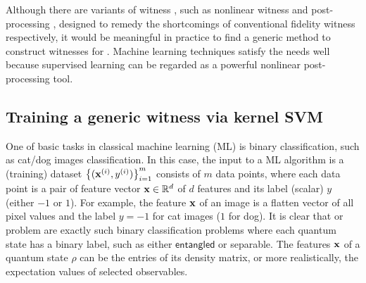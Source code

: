 \documentclass[
aps,
pra,
twocolumn,
floatfix,
]{revtex4-2}
\theoremstyle{plain}
\theoremstyle{definition}
\newcommand{\dm}{\rho}
\newcommand{\entangled}{\textsf{entangled}}
\begin{document}
Although there are variants of witness \cite{zhouEntanglementDetectionCoherent2020}, such as nonlinear witness \cite{guhneNonlinearEntanglementWitnesses2006} and post-processing \cite{zhanDetectingEntanglementUnfaithful2021}, designed to remedy the shortcomings of conventional fidelity witness respectively, 
it would be meaningful in practice to find a generic method to construct witnesses for .
Machine learning techniques satisfy the needs well because supervised learning can be regarded as a powerful nonlinear post-processing tool.


\subsection{Training a generic witness via kernel SVM}
One of basic tasks in classical machine learning (ML) is binary classification,
such as cat/dog images classification. 
In this case, the input to a ML algorithm is a (training) dataset $\qty{(\vb{x}^{(i)},y^{(i)})}_{i=1}^m$ consists of $m$ data points, 
where each data point is a pair of feature vector $\vb{x}\in \mathbb{R}^d$ of $d$ features and its label (scalar) $y$ (either $-1$ or $1$).
For example, the feature $\vb{x}$ of an image is a flatten vector of all pixel values and the label $y=-1$ for \textsf{cat} images ($1$ for \textsf{dog}).
It is clear that  or  problem are exactly such binary classification problems where each quantum state has a binary label, such as either $\entangled$ or \textsf{separable}.
The features $\vb{x}$ of a quantum state $\dm$ can be the entries of its density matrix, or more realistically, the expectation values of selected observables.
\end{document}
